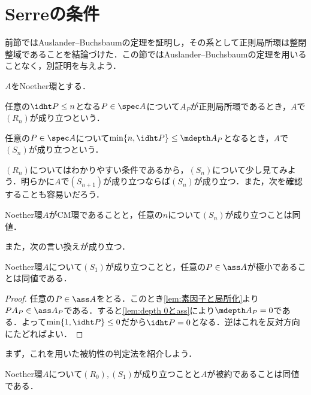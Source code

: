 \section{Serreの条件}

前節ではAuslander--Buchsbaumの定理を証明し，その系として正則局所環は整閉整域であることを結論づけた．この節ではAuslander--Buchsbaumの定理を用いることなく，別証明を与えよう．

\begin{defi}[Serreの条件]
	$A$をNoether環とする．
	\begin{sakura}
		\item 任意の$\idht P\leq n$となる$P\in\spec A$について$A_P$が正則局所環であるとき，$A$で$(R_n)$が成り立つという．
		\item 任意の$P\in\spec A$について$\min\{n,\idht P\}\leq\mdepth A_P$となるとき，$A$で$(S_n)$が成り立つという．
	\end{sakura}
\end{defi}

$(R_n)$についてはわかりやすい条件であるから，$(S_n)$について少し見てみよう．明らかに$A$で$(S_{n+1})$が成り立つならば$(S_n)$が成り立つ．また，次を確認することも容易いだろう．

\begin{prop}
	Noether環$A$がCM環であることと，任意の$n$について$(S_n)$が成り立つことは同値．
\end{prop}

また，次の言い換えが成り立つ．
\begin{lem}
	Noether環$A$について$(S_1)$が成り立つことと，任意の$P\in\ass A$が極小であることは同値である．
\end{lem}

\begin{proof}
	任意の$P\in\ass A$をとる．このとき\ref{lem:素因子と局所化}より$PA_P\in\ass A_P$である．すると\ref{lem:depth 0とass}により$\mdepth A_P=0$である．よって$\min\{1,\idht P\}\leq0$だから$\idht P=0$となる．逆はこれを反対方向にたどればよい．
\end{proof}

まず，これを用いた被約性の判定法を紹介しよう．

\begin{thm}
	Noether環$A$について$(R_0),(S_1)$が成り立つことと$A$が被約であることは同値である．
\end{thm}

